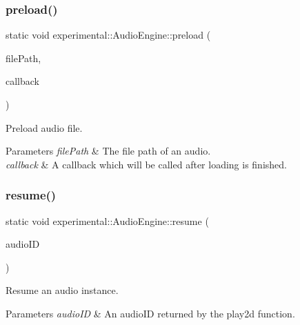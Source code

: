 \subsubsection{\texorpdfstring{preload()}{preload()}\hspace{0.1cm}{\footnotesize\ttfamily [4/4]}}
{\footnotesize\ttfamily static void experimental\+::\+Audio\+Engine\+::preload (\begin{DoxyParamCaption}\item[{const std\+::string \&}]{file\+Path,  }\item[{std\+::function$<$ void(bool is\+Success)$>$}]{callback }\end{DoxyParamCaption})\hspace{0.3cm}{\ttfamily [static]}}

Preload audio file. 
\begin{DoxyParams}{Parameters}
{\em file\+Path} & The file path of an audio. \\
\hline
{\em callback} & A callback which will be called after loading is finished. \\
\hline
\end{DoxyParams}
\mbox{\label{classexperimental_1_1AudioEngine_aa45189f10c2113f68728ee2157e8eb55}} 
\subsubsection{\texorpdfstring{resume()}{resume()}\hspace{0.1cm}{\footnotesize\ttfamily [1/2]}}
{\footnotesize\ttfamily static void experimental\+::\+Audio\+Engine\+::resume (\begin{DoxyParamCaption}\item[{int}]{audio\+ID }\end{DoxyParamCaption})\hspace{0.3cm}{\ttfamily [static]}}

Resume an audio instance.


\begin{DoxyParams}{Parameters}
{\em audio\+ID} & An audio\+ID returned by the play2d function. \\
\hline
\end{DoxyParams}
\mbox{\label{classexperimental_1_1AudioEngine_aa45189f10c2113f68728ee2157e8eb55}} 
